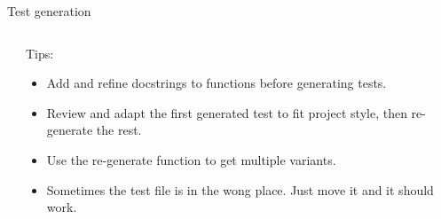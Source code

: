 \documentclass[
  aspectratio=1610,
]{beamer}
\begin{document}
\begin{frame}{Test generation}
  \begin{columns}[T,totalwidth=\textwidth]
    \begin{column}{0.6\textwidth}
    \end{column}
    \begin{column}{0.37\textwidth}
      Tips:
      \begin{itemize}
        \item Add and refine docstrings to functions before generating tests.
        \item Review and adapt the first generated test to fit project style, then re-generate the rest.
        \item Use the re-generate function to get multiple variants.
        \item Sometimes the test file is in the wong place. Just move it and it should work.
      \end{itemize}
    \end{column}
  \end{columns}
\end{frame}
\end{document}
